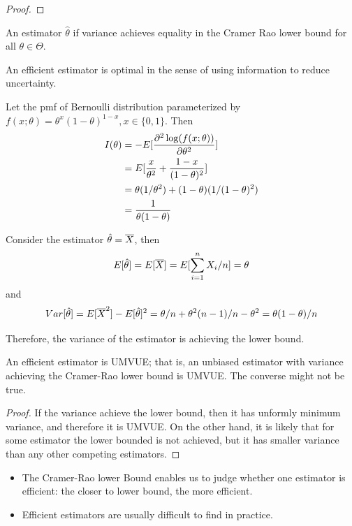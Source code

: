 \begin{refsection}
\begin{proof}
\end{proof}




\begin{definition}
	An estimator $\hat{\theta}$ if variance achieves equality in the Cramer Rao lower bound for all $\theta\in \Theta$.
\end{definition}

\begin{remark}
	An efficient estimator is optimal in the sense of using information to reduce uncertainty.
\end{remark}

\begin{example}
	Let the pmf of Bernoulli distribution parameterized by $f(x;\theta) = \theta^x(1-\theta)^{1-x},x\in\{0,1\}$. Then
	\begin{align*}
	I(\theta) &= -E[\frac{\partial^2 \log(f(x;\theta))}{\partial \theta^2}] \\
	&= E[\frac{x}{\theta^2} + \frac{1-x}{(1-\theta)^2}]\\
	&= \theta (1/\theta^2) + (1-\theta)(1/(1-\theta)^2) \\
	&= \frac{1}{\theta(1-\theta)}
	\end{align*}
	
	Consider the estimator $\hat{\theta} = \overline{X}$, then $$E[\hat{\theta}] = E[\overline{X}] = E[\sum_{i=1}^n X_i/n] = \theta$$
	and
	$$Var[\hat{\theta}] = E[\overline{X}^2] - E[\hat{\theta}]^2 = \theta/n + \theta^2(n-1)/n - \theta^2 = \theta(1-\theta)/n$$
	
	Therefore, the variance of the estimator is achieving the lower bound.
\end{example}

\begin{lemma}
	An efficient estimator is UMVUE; that is, an unbiased estimator with variance achieving the Cramer-Rao lower bound is UMVUE. The converse might not be true.
\end{lemma}
\begin{proof}
	If the variance achieve the lower bound, then it has unformly minimum variance, and therefore it is UMVUE. On the other hand, it is likely that for some estimator the lower bounded is not achieved, but it has smaller variance than any other competing estimators.
\end{proof}

\begin{remark}\hfill
	\begin{itemize}
		\item The Cramer-Rao lower Bound enables us to judge whether one estimator is efficient: the closer to lower bound, the more efficient.
		\item Efficient estimators are usually difficult to find in practice.
	\end{itemize}
\end{remark}




\end{refsection}
